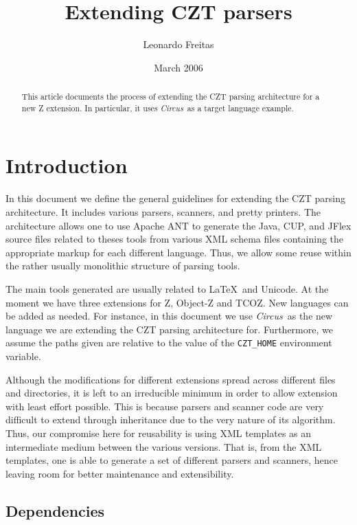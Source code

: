 \documentclass{article}
\newcommand{\Circus}{\textsf{\textit{Circus}}}
\begin{document}
\title{Extending CZT parsers}
\author{Leonardo Freitas}
\date{March 2006}

\maketitle

\begin{abstract}
    \noindent This article documents the process of extending the CZT parsing architecture
    for a new Z extension. In particular, it uses \Circus\ as a target language
    example.
\end{abstract}

\section{Introduction}\label{introduction}

In this document we define the general guidelines for extending the CZT parsing
architecture. It includes various parsers, scanners, and pretty printers. The
architecture allows one to use Apache ANT to generate the Java, CUP, and JFlex
source files related to theses tools from various XML schema files containing
the appropriate markup for each different language. Thus, we allow some reuse
within the rather usually monolithic structure of parsing tools.

The main tools generated are usually related to \LaTeX\ and Unicode. At the
moment we have three extensions for Z, Object-Z and TCOZ. New languages can be
added as needed. For instance, in this document we use \Circus\ as the new
language we are extending the CZT parsing architecture for. Furthermore, we
assume the paths given are relative to the value of the \texttt{CZT\_HOME}
environment variable.

Although the modifications for different extensions spread across different
files and directories, it is left to an irreducible minimum in order to allow
extension with least effort possible. This is because parsers and scanner code
are very difficult to extend through inheritance due to the very nature of its
algorithm. Thus, our compromise here for reusability is using XML templates as
an intermediate medium between the various versions. That is, from the XML
templates, one is able to generate a set of different parsers and scanners,
hence leaving room for better maintenance and extensibility.

\subsection{Dependencies}
\end{document}
